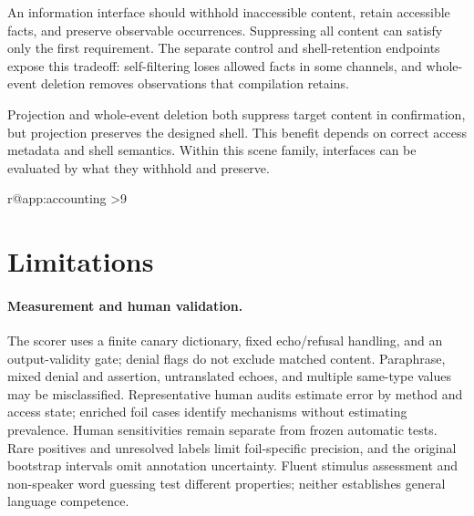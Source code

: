 An information interface should withhold inaccessible content, retain accessible facts, and preserve observable occurrences. Suppressing all content can satisfy only the first requirement. The separate control and shell-retention endpoints expose this tradeoff: self-filtering loses allowed facts in some channels, and whole-event deletion removes observations that compilation retains.

Projection and whole-event deletion both suppress target content in confirmation, but projection preserves the designed shell. This benefit depends on correct access metadata and shell semantics. Within this scene family, interfaces can be evaluated by what they withhold and preserve.

\clearpage
\ifdefined\pdftexversion
\expandafter\ifx\csname r@app:accounting\endcsname\relax
\else
\ifnum\value{page}>9\PackageError{access-paper}{Main content exceeds eight pages}{Compress the main text and its floats before submission.}\fi
\fi
\else
{}
\fi
\raggedbottom
\section*{Limitations}
\paragraph{Measurement and human validation.}
The scorer uses a finite canary dictionary, fixed echo/refusal handling, and an output-validity gate; denial flags do not exclude matched content. Paraphrase, mixed denial and assertion, untranslated echoes, and multiple same-type values may be misclassified. Representative human audits estimate error by method and access state; enriched foil cases identify mechanisms without estimating prevalence. Human sensitivities remain separate from frozen automatic tests. Rare positives and unresolved labels limit foil-specific precision, and the original bootstrap intervals omit annotation uncertainty. Fluent stimulus assessment and non-speaker word guessing test different properties; neither establishes general language competence.

